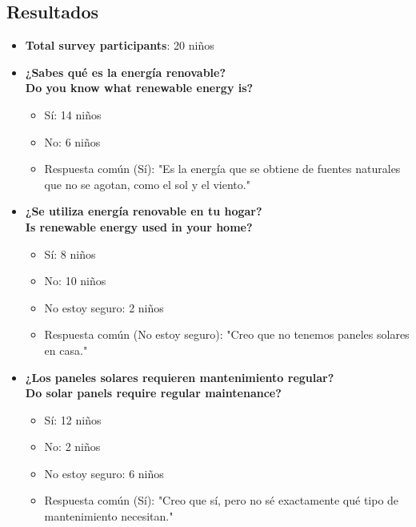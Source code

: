 \documentclass[12pt]{article}
\begin{document}
\subsection{Resultados}
\begin{itemize}
      \item
            \textbf{Total survey participants}: 20 niños

      \item \textbf{¿Sabes qué es la energía renovable?}\\
            \textbf{Do you know what renewable energy is?}
            \begin{itemize}
                  \item Sí: 14 niños
                  \item No: 6 niños
                  \item Respuesta común (Sí): "Es la energía que se obtiene de fuentes naturales que no se agotan, como el sol y el viento."
            \end{itemize}

      \item \textbf{¿Se utiliza energía renovable en tu hogar?}\\
            \textbf{Is renewable energy used in your home?}
            \begin{itemize}
                  \item Sí: 8 niños
                  \item No: 10 niños
                  \item No estoy seguro: 2 niños
                  \item Respuesta común (No estoy seguro): "Creo que no tenemos paneles solares en casa."
            \end{itemize}

      \item \textbf{¿Los paneles solares requieren mantenimiento regular?}\\
            \textbf{Do solar panels require regular maintenance?}
            \begin{itemize}
                  \item Sí: 12 niños
                  \item No: 2 niños
                  \item No estoy seguro: 6 niños
                  \item Respuesta común (Sí): "Creo que sí, pero no sé exactamente qué tipo de mantenimiento necesitan."
            \end{itemize}


\end{itemize}
\end{document}
